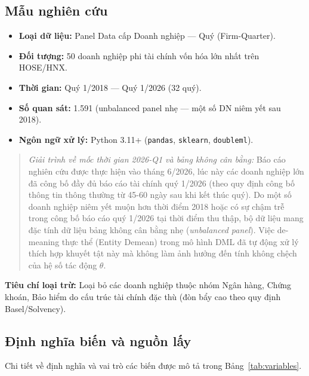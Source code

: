 \documentclass[12pt,a4paper]{article}
\begin{document}
\subsection{Mẫu nghiên cứu}
\begin{itemize}
    \item \textbf{Loại dữ liệu:} Panel Data cấp Doanh nghiệp --- Quý (Firm-Quarter).
    \item \textbf{Đối tượng:} 50 doanh nghiệp phi tài chính vốn hóa lớn nhất trên HOSE/HNX.
    \item \textbf{Thời gian:} Quý 1/2018 --- Quý 1/2026 (32 quý).
    \item \textbf{Số quan sát:} 1.591 (unbalanced panel nhẹ --- một số DN niêm yết sau 2018).
    \item \textbf{Ngôn ngữ xử lý:} Python 3.11+ (\texttt{pandas}, \texttt{sklearn}, \texttt{doubleml}).
\end{itemize}

\begin{quote}
\textit{Giải trình về mốc thời gian 2026-Q1 và bảng không cân bằng:}
Báo cáo nghiên cứu được thực hiện vào tháng 6/2026, lúc này các doanh nghiệp lớn đã công bố đầy đủ báo cáo tài chính quý 1/2026 (theo quy định công bố thông tin thông thường từ 45-60 ngày sau khi kết thúc quý). Do một số doanh nghiệp niêm yết muộn hơn thời điểm 2018 hoặc có sự chậm trễ trong công bố báo cáo quý 1/2026 tại thời điểm thu thập, bộ dữ liệu mang đặc tính dữ liệu bảng không cân bằng nhẹ (\textit{unbalanced panel}). Việc de-meaning thực thể (Entity Demean) trong mô hình DML đã tự động xử lý thích hợp khuyết tật này mà không làm ảnh hưởng đến tính không chệch của hệ số tác động $\theta$.
\end{quote}

\textbf{Tiêu chí loại trừ:} Loại bỏ các doanh nghiệp thuộc nhóm Ngân hàng, Chứng khoán, Bảo hiểm do cấu trúc tài chính đặc thù (đòn bẩy cao theo quy định Basel/Solvency).

\subsection{Định nghĩa biến và nguồn lấy}
Chi tiết về định nghĩa và vai trò các biến được mô tả trong Bảng~\ref{tab:variables}.
\end{document}
